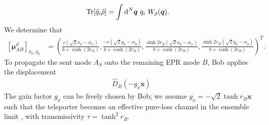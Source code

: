 \documentclass[%
 reprint,
 superscriptaddress,
 amsmath,
 amssymb,
 aps,
 pra,
]{revtex4-2}
\begin{document}
\begin{widetext}
\begin{align} \label{eq:wignerfunc_moments}
    \Tr [\hat q_i \hat \rho] &= \int \dd^N \bm{q} \ q_i \ W_{\hat \rho}(\bm{q}).
\end{align}
We determine that
\begin{align}
    \left[ \bm{\mu}_{AB}^d \right]_{x_0,y_0} &= \left( \frac{c(\sqrt{2}x_0-\alpha_x)}{b+\cosh(2r_B)}, \frac{-c(\sqrt{2}y_0-\alpha_y)}{b+\cosh(2r_B)}, \frac{\sinh2r_B(\sqrt{2}x_0-\alpha_x)}{b+\cosh(2r_B)}, \frac{\sinh2r_B(\sqrt{2}y_0-\alpha_y)}{b+\cosh(2r_B)} \right)^T. \label{eq:singleshot_mean}
\end{align}
To propagate the sent mode $A_S$ onto the remaining EPR mode $B$, Bob applies the displacement
\begin{align}
    \hat D_B( -g_x\bm{x} )
\end{align}
The gain factor $g_x$ can be freely chosen by Bob; we assume $g_x = -\sqrt{2}\tanh r_B \bm{x}$ such that the teleporter becomes an effective pure-loss channel in the ensemble limit \cite{ralph_characterizing_1999}, with transmissivity $\tau = \tanh^2 r_B$.


\end{widetext}
\end{document}

